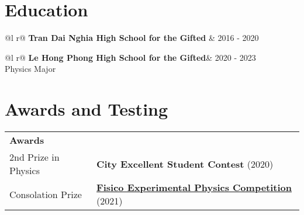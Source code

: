 \documentclass[a4paper,12pt]{article}
\begin{document}
\section{Education}
\begin{tabularx}{\linewidth}{ @{}l r@{} }
\textbf{Tran Dai Nghia High School for the Gifted} & \hfill 2016 - 2020 \\[3.75pt]
\end{tabularx}


\begin{tabularx}{\linewidth}{ @{}l r@{} }
\textbf{Le Hong Phong High School for the Gifted}& \hfill 2020 - 2023 \\
Physics Major\\ [3.75pt]
\end{tabularx}

\section{Awards and Testing}
\begin{tabularx}{\linewidth}{@{}l X@{}}	
\textbf{Awards} & \hfill \\[3.75pt]
 2nd Prize in Physics & \textbf{City Excellent Student Contest} \hfill \normalsize (2020) \\
Consolation Prize & \href{https://drive.google.com/file/d/1ohseLRWsZussnLpvH9nWSYuEiQBzvMuk/view?usp=share_link}{\textbf{Fisico Experimental Physics Competition}} \hfill(2021) \\ 
\end{tabularx}
\end{document}
